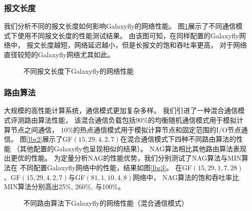 \subsubsection{报文长度}

我们分析不同的报文长度如何影响Galaxyfly的网络性能。
图\ref{fig:packetsize}展示了不同通信模式下使用不同报文长度的性能测试结果。
由该图可知，在同样配置的Galaxyfly网络中，
报文长度越短，网络延迟越小，但是长报文的饱和吞吐率更高，
对于网络直径较短的Galaxyfly网络尤其如此。
\begin{figure}
  \centering
  \begin{minipage}[t]{\textwidth}
    \centering
    \caption{不同报文长度下Galaxyfly的网络性能}
    \label{fig:packetsize}
  \end{minipage}
\end{figure}

\subsubsection{路由算法}

大规模的高性能计算系统，通信模式更加复杂多样。
我们引进了一种混合通信模式评测路由算法性能，
该混合通信负载包括$90\%$的均衡随机通信模式用于模拟计算节点之间通信，
$10\%$的热点通信模式用于模拟计算节点和固定范围的I/O节点通信。
图\ref{lbr2}展示了GF$(15,29,4,2,7)$在混合通信模式下四种不同路由算法的性能
（其他配置的Galaxyfly也呈现相似的结果）。
NAG算法相比其他路由算法表现出更优的性能。
为定量分析NAG的性能优势，我们分别测试了NAG算法与MIN算法在
不同配置Galaxyfly网络中的性能，结果如图\ref{lbr3}。
在GF$(15,29,1,7,28)$、GF$(15,29,4,2,7)$与GF$(81,1,10,4,8)$网络中，
NAG算法的饱和吞吐率比MIN算法分别高出25\%, 260\%, 与100\%。

\begin{figure}
  \centering
  \begin{minipage}[t]{\textwidth}
    \centering
    \caption{不同路由算法下Galaxyfly的网络性能（混合通信模式）}
    \label{fig:routingalgorithms}
  \end{minipage}
\end{figure}

